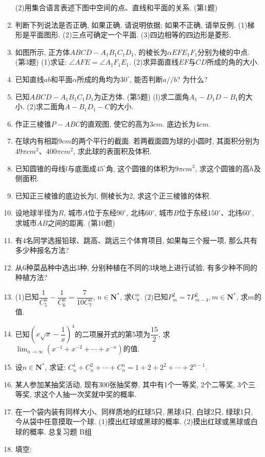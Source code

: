 \documentclass[10pt,a4paper]{article}
\begin{document}
\begin{enumerate}[1.]
(2)用集合语言表述下图中空间的点、直线和平面的关系.
(第1题)
\item 判断下列说法是否正确, 如果正确, 请说明依据; 如果不正确, 请举反例.
(1)梯形是平面图形.
(2)三点可确定一个平面.
(3)四边相等的四边形是菱形.
\item 如图所示, 正方体$ABCD-A_1B_1C_1D_1$, 的棱长为$\alpha EFE_1F_1$分别为棱的中点.
(第3题)
(1)求证: $\angle AFE=\angle A_1F_1E_1$.
(2)求异面直线$EF$与$CD$所成的角的大小.
\item 已知直线$ab$和平面$\alpha$所成的角均为$30^\circ$, 能否判断$a//b$? 为什么?
\item 已知$ABCD-A_1B_1C_1D_1$为正方体.
(第5题)
(l)求二面角$A_1-D_1D-B_1$的大小.
(2)求二面角$A-B_1D_1-C$的大小.
\item 作正三棱锥$P-ABC$的直观图, 使它的高为$3cm$. 底边长为$4cm$.
\item 在球内有相距$9cm$的两个平行的截面. 若两截面圆为球的小圆时, 其面积分别为$49\pi cm^2$、$400\pi cm^2$, 求此球的表面积及体积.
\item 已知圆锥的母线$l$与底面成$45^\circ$角, 这个圆锥的体积为$9\pi cm^3$, 求这个圆锥的高$h$及侧面积.
\item 已知正三棱锥的底边长为l, 侧棱长为2, 求这个正三棱锥的体积.
\item 设地球半径为$R$, 城市$A$位于东经$90^\circ$, 北纬$60^\circ$, 城市$B$位于东经$150^\circ$、北纬$60^\circ$, 求城市$AB$之间的距离.
(第10题)
\item 有4名同学选报铅球、跳高、跳远三个体育项目, 如果每三个报一项, 那么共有多少种报名方法?
\item 从6种菜品种中选出3种, 分别种植在不同的3块地上进行试验, 有多少种不同的种植方法?
\item (1)已知$\dfrac 1{C_5^n}-\dfrac 1{C_6^n}=\dfrac 7{10C_7^n}$, $n\in \mathbf{N}^*$, 求$\mathrm{C}_8^n$.
(2)已知$P_m^2=7P_{m-4}^2,m\in \mathbf{N}^*$, 求$m$的值.
\item 已知$(x\sqrt x-\dfrac 1x)^4$的二项展开式的第5项为$\dfrac{15}2$, 求$\displaystyle\lim_{n\to\infty}(x^{-1}+x^{-2}+\cdots +x^{-n})$的值.
\item 设$n\in \mathbf{N}^*$, 求证: $C_n^1+C_n^2+\cdots +C_n^n=1+2+2^2+\cdots +2^{n-1}$.
\item 某人参加某抽奖活动, 现有300张抽奖劵, 其中有1个一等奖, 2个二等奖, 3个三等奖, 求这个人抽一次奖就中奖的概率.
\item 在一个袋内装有同样大小、同样质地的红球5只, 黑球4只, 白球2只, 绿球1只, 今从袋中任意摸取一个球.
(1)摸出红球或黑球的概率.
(2)摸出红球或黑球或白球的概率.
总复习题
B组
\item 填空:

\end{enumerate}
\end{document}
